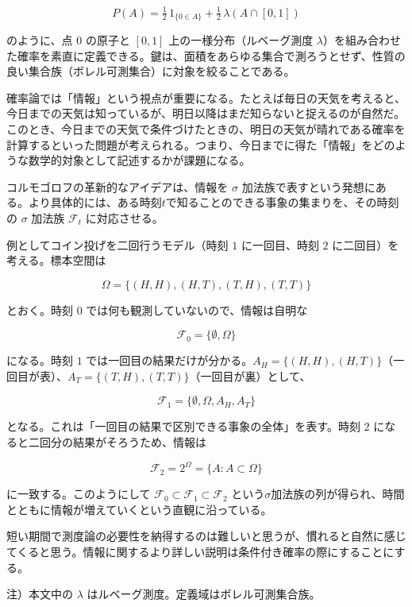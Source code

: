 \documentclass[a4paper,10pt,pdflatex,ja=standard,jafont=ipaex-type1,
  magstyle=real,scale=1]{bxjsarticle}
\begin{document}
$$ P(A)=\tfrac{1}{2}\,\mathrm{1}_{\{0\in A\}}+\tfrac{1}{2}\,\lambda(A\cap[0,1]) $$

のように、点 $0$ の原子と $[0,1]$ 上の一様分布（ルベーグ測度 $\lambda$）を組み合わせた確率を素直に定義できる。鍵は、面積をあらゆる集合で測ろうとせず、性質の良い集合族（ボレル可測集合）に対象を絞ることである。\par

確率論では「情報」という視点が重要になる。たとえば毎日の天気を考えると、今日までの天気は知っているが、明日以降はまだ知らないと捉えるのが自然だ。このとき、今日までの天気で条件づけたときの、明日の天気が晴れである確率を計算するといった問題が考えられる。つまり、今日までに得た「情報」をどのような数学的対象として記述するかが課題になる。\par

コルモゴロフの革新的なアイデアは、情報を $\sigma$ 加法族で表すという発想にある。より具体的には、ある時刻$t$で知ることのできる事象の集まりを、その時刻の $\sigma$ 加法族 $\mathcal F_t$ に対応させる。\par

例としてコイン投げを二回行うモデル（時刻 $1$ に一回目、時刻 $2$ に二回目）を考える。標本空間は\par

$$ \Omega=\{(H,H),(H,T),(T,H),(T,T)\} $$

とおく。時刻 $0$ では何も観測していないので、情報は自明な\par

$$ \mathcal F_0=\{\emptyset,\Omega\} $$

になる。時刻 $1$ では一回目の結果だけが分かる。$A_H=\{(H,H),(H,T)\}$（一回目が表）、$A_T=\{(T,H),(T,T)\}$（一回目が裏）として、\par

$$ \mathcal F_1=\{\emptyset,\Omega,A_H,A_T\} $$

となる。これは「一回目の結果で区別できる事象の全体」を表す。時刻 $2$ になると二回分の結果がそろうため、情報は\par

$$ \mathcal F_2=2^{\Omega}=\{A: A\subset \Omega\} $$

に一致する。このようにして $ \mathcal F_0\subset \mathcal F_1\subset \mathcal F_2 $ という$\sigma$加法族の列が得られ、時間とともに情報が増えていくという直観に沿っている。\par

短い期間で測度論の必要性を納得するのは難しいと思うが、慣れると自然に感じてくると思う。情報に関するより詳しい説明は条件付き確率の際にすることにする。\par

{\small\color{muted} 注）本文中の $\lambda$ はルベーグ測度。定義域はボレル可測集合族。}\par

\endgroup
\end{document}
